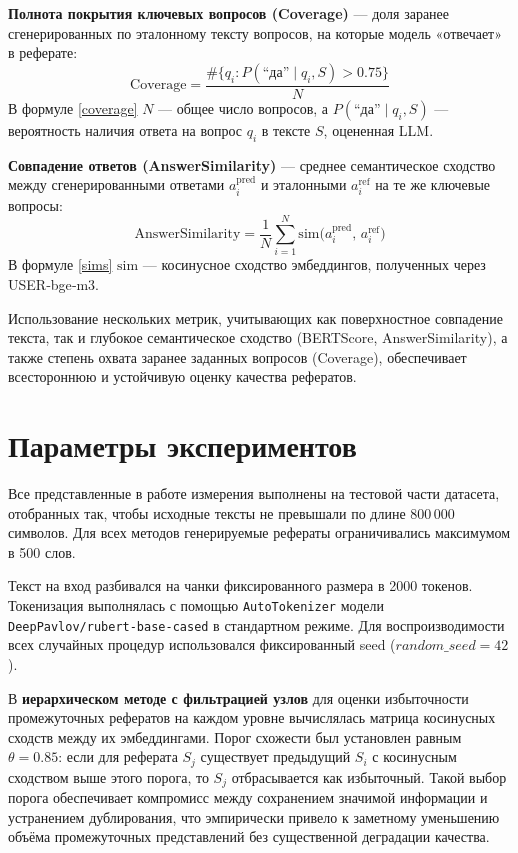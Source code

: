 \documentclass{article}
\begin{document}
\textbf{Полнота покрытия ключевых вопросов (Coverage)} — доля заранее сгенерированных по эталонному тексту вопросов, на которые модель «отвечает» в реферате:
\begin{equation}\label{coverage}
  \text{Coverage} = \frac{\#\{q_i\colon P(\text{“да”}\mid q_i,S)\!>\!0.75\}}{N}
\end{equation}
В формуле \eqref{coverage} $N$ — общее число вопросов, а $P(\text{“да”}\mid q_i,S)$ — вероятность наличия ответа на вопрос $q_i$ в тексте $S$, оцененная LLM.

\textbf{Совпадение ответов (AnswerSimilarity)} — среднее семантическое сходство между сгенерированными ответами $a_i^{\text{pred}}$ и эталонными $a_i^{\text{ref}}$ на те же ключевые вопросы:
\begin{equation}\label{sims}
  \text{AnswerSimilarity} = \frac{1}{N}\sum_{i=1}^N \mathrm{sim}\bigl(a_i^{\text{pred}},\,a_i^{\text{ref}}\bigr)
\end{equation}
В формуле \eqref{sims} $\mathrm{sim}$ — косинусное сходство эмбеддингов, полученных через USER‑bge‑m3.


Использование нескольких метрик, учитывающих как поверхностное совпадение текста, так и глубокое семантическое сходство (BERTScore, AnswerSimilarity), 
а также степень охвата заранее заданных вопросов (Coverage), обеспечивает всестороннюю и устойчивую оценку качества рефератов.

\section*{Параметры экспериментов}

Все представленные в работе измерения выполнены на тестовой части датасета, 
отобранных так, чтобы исходные тексты не превышали по длине 800\,000 символов. 
Для всех методов генерируемые рефераты ограничивались максимумом в 500 слов.

Текст на вход разбивался на чанки фиксированного размера в 2000 токенов. 
Токенизация выполнялась с помощью \texttt{AutoTokenizer} модели \texttt{DeepPavlov/rubert-base-cased} в стандартном режиме.
Для воспроизводимости всех случайных процедур использовался фиксированный seed ($random\_seed = 42$).

В \textbf{иерархическом методе с фильтрацией узлов} для оценки избыточности промежуточных рефератов на каждом уровне вычислялась матрица косинусных сходств между их эмбеддингами.
Порог схожести был установлен равным $\theta=0.85$: если для реферата $S_j$ существует предыдущий $S_i$ с косинусным сходством выше этого порога, 
то $S_j$ отбрасывается как избыточный. Такой выбор порога обеспечивает компромисс между сохранением значимой информации и устранением дублирования, 
что эмпирически привело к заметному уменьшению объёма промежуточных представлений без существенной деградации качества.
\end{document}
